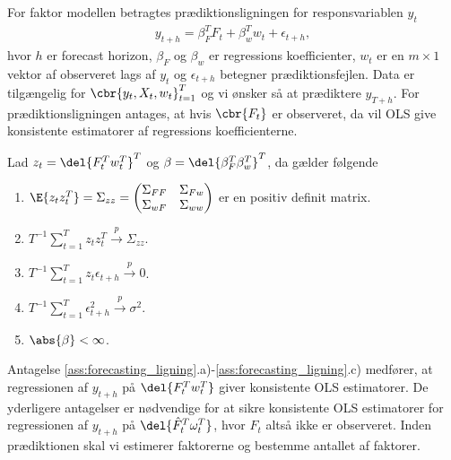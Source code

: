 For faktor modellen betragtes prædiktionsligningen for responsvariablen \(y_t\)
\begin{align}
y_{t+h} = \beta_F^T F_t + \beta_w^T w_t + \epsilon_{t+h}, \label{eq:factor_model_forecast}
\end{align}
hvor \(h\) er forecast horizon, \(\beta_F\) og \(\beta_w\) er regressions koefficienter, \(w_t\) er en \(m \times 1\) vektor af observeret lags af \(y_t\) og \(\epsilon_{t+h}\) betegner prædiktionsfejlen.
Data er tilgængelig for \(\cbr{y_t, X_t, w_t}_{t=1}^T\) og vi ønsker så at prædiktere \(y_{T+h}\).
For prædiktionsligningen antages, at hvis \(\cbr{F_t}\) er observeret, da vil OLS give konsistente estimatorer af regressions koefficienterne.
%
\begin{ass} \label{ass:forecasting_ligning}
Lad \(z_t = \del{F_t^T w_t^T}^T\) og \(\beta = \del{\beta_F^T \beta_w^T}^T\), da gælder følgende
\begin{enumerate}[label=\alph*)]
\item \(\E{z_t z_t^T} = \Sigma_{zz} = \begin{pmatrix}
\Sigma_{FF} & \Sigma_{F w} \\
\Sigma_{w F} & \Sigma_{w w}
\end{pmatrix} \) er en positiv definit matrix.
\item \(T^{-1} \sum_{t=1}^T z_t z_t^T \overset{p}{\rightarrow} \Sigma_{zz}\).
\item \(T^{-1} \sum_{t=1}^T z_t \epsilon_{t+h} \overset{p}{\rightarrow} 0\).
\item  \(T^{-1} \sum_{t=1}^T \epsilon_{t+h}^2 \overset{p}{\rightarrow} \sigma^2\).
\item \(\abs{\beta} < \infty\).
\end{enumerate}
\end{ass}
%
Antagelse \ref{ass:forecasting_ligning}.a)-\ref{ass:forecasting_ligning}.c) medfører, at regressionen af \(y_{t+h}\) på \(\del{F_t^T w_t^T}\) giver konsistente OLS estimatorer.
De yderligere antagelser er nødvendige for at sikre konsistente OLS estimatorer for regressionen af \(y_{t+h}\) på \(\del{\hat{F}_t^T \omega_t^T}\), hvor \(F_t\) altså ikke er observeret.
Inden prædiktionen skal vi estimerer faktorerne og bestemme antallet af faktorer.

